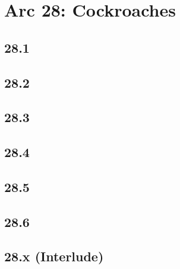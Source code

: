 \part{Arc 28: Cockroaches}
 \chapter{28.1}
 \chapter{28.2}
 \chapter{28.3}
 \chapter{28.4}
 \chapter{28.5}
 \chapter{28.6}
 \chapter{28.x (Interlude)}








